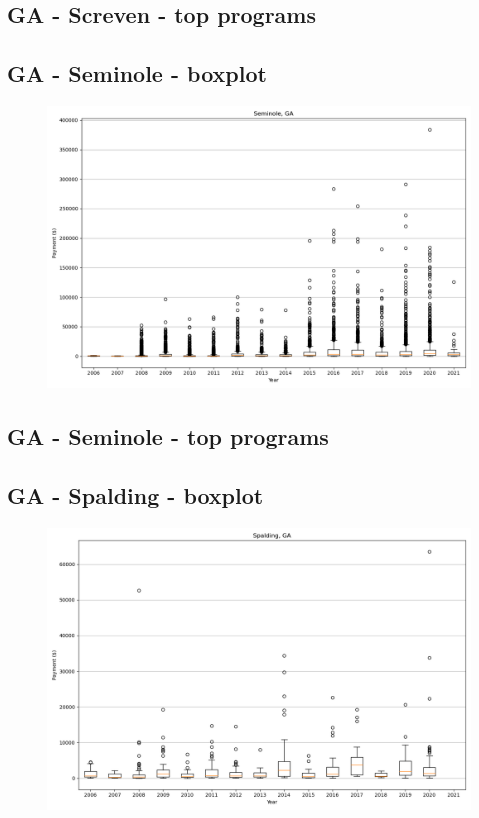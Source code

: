 \subsection*{GA - Screven - top programs}

\newpage
\subsection*{GA - Seminole - boxplot}
\begin{figure}[h]
\centering
\includegraphics[width=7in]{../output/boxplots/counties/Seminole-GA_boxplot.png}
\end{figure}


\subsection*{GA - Seminole - top programs}

\newpage
\subsection*{GA - Spalding - boxplot}
\begin{figure}[h]
\centering
\includegraphics[width=7in]{../output/boxplots/counties/Spalding-GA_boxplot.png}
\end{figure}


